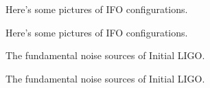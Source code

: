\begin{figure}[p]
\begin{center}
Here's some pictures of IFO configurations.
\end{center}
\caption{\label{f:ifodesign}%
Here's some pictures of IFO configurations.
}
\end{figure}

\begin{figure}[p]
\begin{center}
The fundamental noise sources of Initial LIGO.
\end{center}
\caption{\label{f:design_noisecurve}%
The fundamental noise sources of Initial LIGO.
}
\end{figure}
